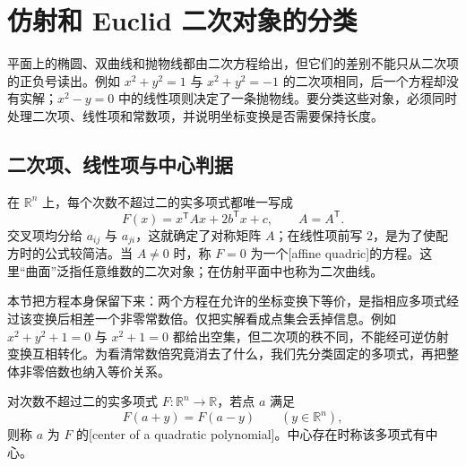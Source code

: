 
% 
% 

\section{仿射和 Euclid 二次对象的分类}
\label{g1:sec:0202}

平面上的椭圆、双曲线和抛物线都由二次方程给出，但它们的差别不能只从二次项的正负号读出。例如 \(x^2+y^2=1\) 与 \(x^2+y^2=-1\) 的二次项相同，后一个方程却没有实解；\(x^2-y=0\) 中的线性项则决定了一条抛物线。要分类这些对象，必须同时处理二次项、线性项和常数项，并说明坐标变换是否需要保持长度。

\subsection{二次项、线性项与中心判据}
\label{g1:subsec:0202:01}

在 \(\mathbb R^n\) 上，每个次数不超过二的实多项式都唯一写成
\begin{equation}
	\label{g1:eq:affine-quadratic-polynomial}
	F(x)=x^{\mathsf T}Ax+2b^{\mathsf T}x+c,
	\qquad A=A^{\mathsf T}.
\end{equation}
交叉项均分给 \(a_{ij}\) 与 \(a_{ji}\)，这就确定了对称矩阵 \(A\)；在线性项前写 \(2\)，是为了使配方时的公式较简洁。当 \(A\ne0\) 时，称 \(F=0\) 为一个[affine quadric]的方程。这里“曲面”泛指任意维数的二次对象；在仿射平面中也称为二次曲线。

\ProseParagraphBreak

本节把方程本身保留下来：两个方程在允许的坐标变换下等价，是指相应多项式经过该变换后相差一个非零常数倍。仅把实解看成点集会丢掉信息。例如 \(x^2+y^2+1=0\) 与 \(x^2+1=0\) 都给出空集，但二次项的秩不同，不能经可逆仿射变换互相转化。为看清常数倍究竟消去了什么，我们先分类固定的多项式，再把整体非零倍数也纳入等价关系。

\begin{definition}
	\label{g1:def:quadric-center}
	对次数不超过二的实多项式 \(F\colon\mathbb R^n\rightarrow\mathbb R\)，若点 \(a\) 满足
	\[
		F(a+y)=F(a-y)\qquad(y\in\mathbb R^n),
	\]
	则称 \(a\) 为 \(F\) 的[center of a quadratic polynomial]。中心存在时称该多项式有中心。
\end{definition}

